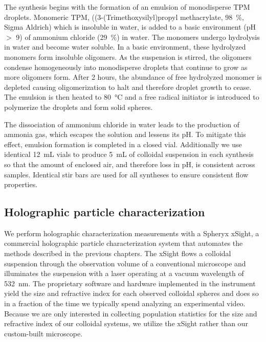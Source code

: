 The synthesis begins with the formation of an emulsion of monodisperse TPM droplets.
Monomeric TPM, ((3-(Trimethoxysilyl)propyl methacrylate, \SI{98}{\percent}, Sigma Aldrich)
which is insoluble in water, is added to a basic environment
(pH $>$ \num{9}) of ammonium chloride (\SI{29}{\percent}) in water.
The monomers undergo hydrolysis in water and become water soluble. 
In a basic environment, these hydrolyzed monomers form insoluble 
oligomers. As the suspension is stirred, the oligomers condense 
homogeneously into monodisperse droplets that continue to grow as more oligomers form.
After \num{2} hours, the abundance of free hydrolyzed monomer is depleted
causing oligomerization to halt and therefore droplet growth to cease.
The emulsion is then heated to \SI{80}{\degreeCelsius} and a free radical 
initiator is introduced to polymerize the droplets and form solid spheres.

The dissociation of ammonium chloride in water leads to the production of ammonia
gas, which escapes the solution and lessens its pH.
To mitigate this effect, emulsion formation is completed in a closed vial.
Additionally we use identical \SI{12}{\milli\liter} vials to produce \SI{5}{\milli\liter}
of colloidal suspension in each synthesis so that the amount of enclosed air, and therefore
loss in pH, is consistent across samples. Identical stir bars are used for all syntheses
to ensure consistent flow properties.

\subsection{Holographic particle characterization}

We perform holographic characterization measurements with a Spheryx xSight,
a commercial holographic particle characterization system
that automates the methods described in the previous chapters.
The xSight flows a colloidal suspension through the observation volume of a conventional microscope
and illuminates the suspension with a laser operating at a vacuum wavelength of \SI{532}{\nm}.
The proprietary software and hardware implemented in
the instrument yield the size and refractive index for each observed colloidal spheres and
does so in a fraction of the time we typically spend analyzing an experimental video.
Because we are only interested in collecting population statistics for the size and refractive
index of our colloidal systems, we utilize the xSight rather than our custom-built microscope.

